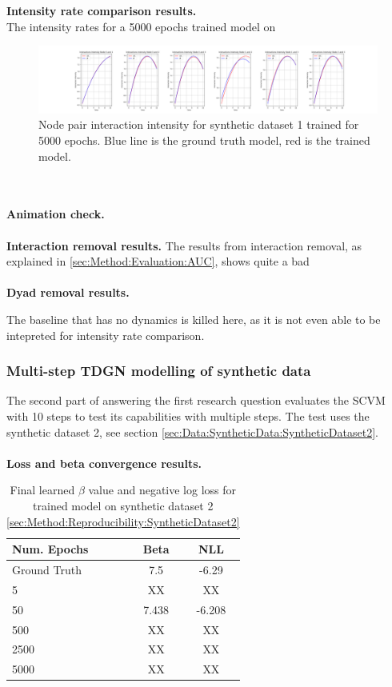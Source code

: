 \\\\
\textbf{Intensity rate comparison results.}
\\
The intensity rates for a 5000 epochs trained model on 

\begin{figure}[H]
    \centering
    \includegraphics[width=\textwidth]{0_images/synth1_epochs5000.png}
    \caption{Node pair interaction intensity for synthetic dataset 1 trained for 5000 epochs. Blue line is the ground truth model, red is the trained model.}
    \label{fig:RQ1synth1}
\end{figure}
\\\\
\textbf{Animation check.}
\\\\
\textbf{Interaction removal results.}
The results from interaction removal, as explained in \ref{sec:Method:Evaluation:AUC}, shows quite a bad 
\\\\
\textbf{Dyad removal results.}

The baseline that has no dynamics is killed here, as it is not even able to be intepreted for intensity rate comparison.




\subsubsection{Multi-step TDGN modelling of synthetic data}
\label{sec:ResearchQuestion1:multiStepSynthetic}
The second part of answering the first research question evaluates the SCVM with 10 steps to test its capabilities with multiple steps.
The test uses the synthetic dataset 2, see section \ref{sec:Data:SyntheticData:SyntheticDataset2}.
\\\\
\textbf{Loss and beta convergence results.}

\begin{table}[H]
\centering
\begin{tabular}{|l|cc|}
\hline
Num. Epochs   & Beta & NLL\\ \hline
Ground Truth & 7.5  & -6.29      \\
5          & XX   & XX       \\
50          & 7.438   & -6.208       \\
500          & XX   & XX       \\
2500          & XX   & XX       \\
5000          & XX   & XX       \\
\hline
\end{tabular}
\caption{Final learned $\beta$ value and negative log loss for trained model on synthetic dataset 2 \ref{sec:Method:Reproducibility:SyntheticDataset2}}
\label{tab:MultiStep1}
\end{table}

